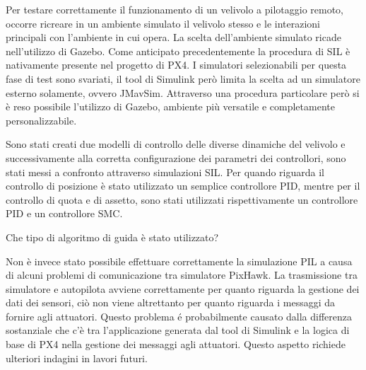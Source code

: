 Per testare correttamente il funzionamento di un velivolo a pilotaggio remoto, occorre ricreare in un ambiente simulato il velivolo stesso e le interazioni principali con l'ambiente in cui opera. La scelta dell'ambiente simulato ricade nell'utilizzo di Gazebo. Come anticipato precedentemente la procedura di SIL è nativamente presente nel progetto di PX4. I simulatori selezionabili per questa fase di test sono svariati, il tool di Simulink però limita la scelta ad un simulatore esterno solamente, ovvero JMavSim. Attraverso una procedura particolare però si è reso possibile l'utilizzo di Gazebo, ambiente più versatile e completamente personalizzabile.

Sono stati creati due modelli di controllo delle diverse dinamiche del velivolo e successivamente alla corretta configurazione dei parametri dei controllori, sono stati messi a confronto attraverso simulazioni SIL. Per quando riguarda il controllo di posizione è stato utilizzato un semplice controllore PID, mentre per il controllo di quota e di assetto, sono stati utilizzati rispettivamente un controllore PID e un controllore SMC. 

\begin{commento}
	Che tipo di algoritmo di guida è stato utilizzato?
\end{commento}

Non è invece stato possibile effettuare correttamente la simulazione PIL a causa di alcuni problemi di comunicazione tra simulatore PixHawk. La trasmissione tra simulatore e autopilota avviene correttamente per quanto riguarda la gestione dei dati dei sensori, ciò non viene altrettanto per quanto riguarda i messaggi da fornire agli attuatori. Questo problema é probabilmente causato dalla differenza sostanziale che c'è tra l'applicazione generata dal tool di Simulink e la logica di base di PX4 nella gestione dei messaggi agli attuatori. Questo aspetto richiede ulteriori indagini in lavori futuri.